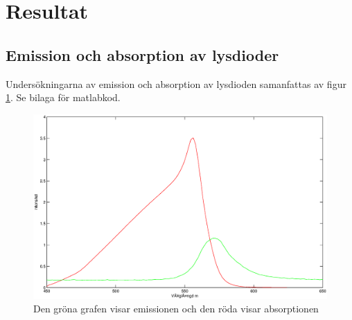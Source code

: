 \documentclass[a4paper]{article}
\begin{document}
\newpage
\section{Resultat}
\subsection{Emission och absorption av lysdioder}
Undersökningarna av emission och absorption av lysdioden samanfattas av figur \ref{emabs}. Se bilaga för matlabkod.
\begin{figure}[H]
        \centering
        \includegraphics[scale=.4]{emabs.eps}
        \caption{Den gröna grafen visar emissionen och den röda visar absorptionen}
        \label{emabs}
\end{figure}
\end{document}
